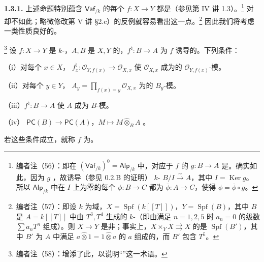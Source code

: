 \textbf{1.3.1.} 上述命题特别蕴含 $\mathsf{Vaf}_{/k}$ 的每个 $f:X\to Y$ 都是（参见第 IV 讲 1.3）。\footnote{编者注（56）：即在 $(\mathsf{Vaf}_{/k})^0=\mathsf{Alp}_{/k}$ 中，对应于 $f$ 的 $g:B\to A$ 是。确实如此，因为 $g$ ，故诱导（参见 0.2.B 的证明） $k$- $B/I\xrightarrow{\sim}A$，其中 $I=\operatorname{Ker}g$。所以 $\mathsf{Alp}_{/k}$ 中在 $I$ 上为零的每个 $\phi:B\to C$ 都为 $\overline\phi:A\to C$，使得 $\phi=\overline\phi\circ g$。} 对却不如此；略微修改第 V 讲 \S2.c）的反例就容易看出这一点。\footnote{编者注（57）：即设 $k$ 为域，$X=\operatorname{Spf}(k[[T]])$，$Y=\operatorname{Spf}(B)$，其中 $B$ 是 $A=k[[T]]$ 中由 $T^3,T^4$ 生成的 $k$-（即由满足 $n=1,2,5$ 时 $a_n=0$ 的级数 $\sum a_nT^n$ 组成）。则 $X\to Y$ 是非；事实上，$X\times_Y X\rightrightarrows X$ 的是 $\operatorname{Spf}(B')$，其中 $B'$ 为 $A$ 中满足 $a\widehat\otimes1=1\widehat\otimes a$ 的 $a$ 组成的，而 $B'$ 包含 $T^5$。}
因此我们将考虑一类性质良好的。
\begin{SGAresult}{}{}
\footnote{编者注（58）：增添了此，以说明“”这一术语。}
设 $f:X\to Y$ 是 $k$-，$A,B$ 是 $X,Y$ 的，$f^\natural:B\to A$ 为 $f$ 诱导的。下列条件：

（i）对每个 $x\in X$， $f_x^\natural:\mathcal O_{Y,f(x)}\to\mathcal O_{X,x}$ 使 $\mathcal O_{X,x}$ 成为的 $\mathcal O_{Y,f(x)}$-模。

（ii）对每个 $y\in Y$， $A_y=\prod_{f(x)=y}\mathcal O_{X,x}$ 为的 $B_y$-模。

（iii）$f^\natural:B\to A$ 使 $A$ 成为 $B$-模。

（iv） $\mathsf{PC}(B)\to\mathsf{PC}(A)$，$M\mapsto M\widehat\otimes_B A$ 。

若这些条件成立，就称 $f$ 为。
\end{SGAresult}

